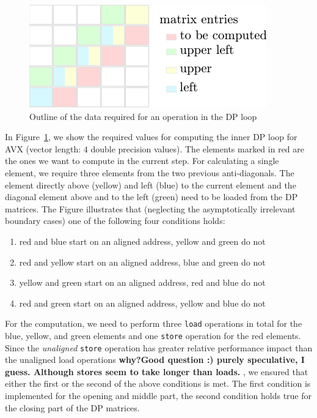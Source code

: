 \documentclass[runningheads,a4paper]{llncs}
\begin{document}
\begin{figure}[ht!]
  \centering
  \includegraphics[scale=1.1]{figures/alignment.pdf}
  \caption{Outline of the data required for an operation in the DP loop}
  \label{fig:alignment}
\end{figure}

In Figure~\ref{fig:alignment}, we show the required values for computing the inner DP loop for AVX (vector length: $4$ double precision values). 
The elements marked in red are the ones we want to compute in the current step. 
For calculating a single element, we require three elements from the two previous anti-diagonals. 
The element directly above (yellow) and left (blue) to the current element and the diagonal element above and to the left  (green) need to be loaded from the DP matrices. 
The Figure illustrates that (neglecting the asymptotically irrelevant boundary cases) one of the following four conditions holds:
\begin{enumerate}
  \item red and blue start on an aligned address, yellow and green do not
  \item red and yellow start on an aligned address, blue and green do not
  \item yellow and green start on an aligned address, red and blue do not
  \item red and green start on an aligned address, yellow and blue do not
\end{enumerate}

For the computation, we need to perform three \texttt{load} operations in total for the blue, yellow, and green elements and one \texttt{store} operation for the red elements. 
Since the {\em unaligned} \texttt{store} operation has greater relative performance impact than the unaligned load operations {\bf why?}{\bf Good question :) purely speculative, I guess. Although stores seem to take longer than loads. } , 
we ensured that either the first or the second of the above conditions is met. 
The first condition is implemented for the opening and middle part, the second condition holds true for the closing part of the DP matrices.
\end{document}
